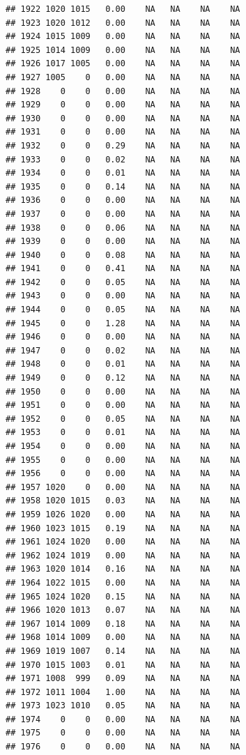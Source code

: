 \documentclass{article}\usepackage{graphicx, color}
\makeatletter
\newenvironment{kframe}{%
 \def\at@end@of@kframe{}%
 \ifinner\ifhmode%
  \def\at@end@of@kframe{\end{minipage}}%
  \begin{minipage}{\columnwidth}%
 \fi\fi%
 \def\FrameCommand##1{\hskip\@totalleftmargin \hskip-\fboxsep
 \colorbox{shadecolor}{##1}\hskip-\fboxsep
     \hskip-\linewidth \hskip-\@totalleftmargin \hskip\columnwidth}%
 \MakeFramed {\advance\hsize-\width
   \@totalleftmargin\z@ \linewidth\hsize
   \@setminipage}}%
 {\par\unskip\endMakeFramed%
 \at@end@of@kframe}
\newenvironment{knitrout}{}{} %
\makeatother
\begin{document}
\begin{knitrout}
\begin{kframe}
\begin{verbatim}
## 1922 1020 1015   0.00    NA   NA    NA    NA
## 1923 1020 1012   0.00    NA   NA    NA    NA
## 1924 1015 1009   0.00    NA   NA    NA    NA
## 1925 1014 1009   0.00    NA   NA    NA    NA
## 1926 1017 1005   0.00    NA   NA    NA    NA
## 1927 1005    0   0.00    NA   NA    NA    NA
## 1928    0    0   0.00    NA   NA    NA    NA
## 1929    0    0   0.00    NA   NA    NA    NA
## 1930    0    0   0.00    NA   NA    NA    NA
## 1931    0    0   0.00    NA   NA    NA    NA
## 1932    0    0   0.29    NA   NA    NA    NA
## 1933    0    0   0.02    NA   NA    NA    NA
## 1934    0    0   0.01    NA   NA    NA    NA
## 1935    0    0   0.14    NA   NA    NA    NA
## 1936    0    0   0.00    NA   NA    NA    NA
## 1937    0    0   0.00    NA   NA    NA    NA
## 1938    0    0   0.06    NA   NA    NA    NA
## 1939    0    0   0.00    NA   NA    NA    NA
## 1940    0    0   0.08    NA   NA    NA    NA
## 1941    0    0   0.41    NA   NA    NA    NA
## 1942    0    0   0.05    NA   NA    NA    NA
## 1943    0    0   0.00    NA   NA    NA    NA
## 1944    0    0   0.05    NA   NA    NA    NA
## 1945    0    0   1.28    NA   NA    NA    NA
## 1946    0    0   0.00    NA   NA    NA    NA
## 1947    0    0   0.02    NA   NA    NA    NA
## 1948    0    0   0.01    NA   NA    NA    NA
## 1949    0    0   0.12    NA   NA    NA    NA
## 1950    0    0   0.00    NA   NA    NA    NA
## 1951    0    0   0.00    NA   NA    NA    NA
## 1952    0    0   0.05    NA   NA    NA    NA
## 1953    0    0   0.01    NA   NA    NA    NA
## 1954    0    0   0.00    NA   NA    NA    NA
## 1955    0    0   0.00    NA   NA    NA    NA
## 1956    0    0   0.00    NA   NA    NA    NA
## 1957 1020    0   0.00    NA   NA    NA    NA
## 1958 1020 1015   0.03    NA   NA    NA    NA
## 1959 1026 1020   0.00    NA   NA    NA    NA
## 1960 1023 1015   0.19    NA   NA    NA    NA
## 1961 1024 1020   0.00    NA   NA    NA    NA
## 1962 1024 1019   0.00    NA   NA    NA    NA
## 1963 1020 1014   0.16    NA   NA    NA    NA
## 1964 1022 1015   0.00    NA   NA    NA    NA
## 1965 1024 1020   0.15    NA   NA    NA    NA
## 1966 1020 1013   0.07    NA   NA    NA    NA
## 1967 1014 1009   0.18    NA   NA    NA    NA
## 1968 1014 1009   0.00    NA   NA    NA    NA
## 1969 1019 1007   0.14    NA   NA    NA    NA
## 1970 1015 1003   0.01    NA   NA    NA    NA
## 1971 1008  999   0.09    NA   NA    NA    NA
## 1972 1011 1004   1.00    NA   NA    NA    NA
## 1973 1023 1010   0.05    NA   NA    NA    NA
## 1974    0    0   0.00    NA   NA    NA    NA
## 1975    0    0   0.00    NA   NA    NA    NA
## 1976    0    0   0.00    NA   NA    NA    NA

\end{verbatim}
\end{kframe}
\end{knitrout}
\end{document}
